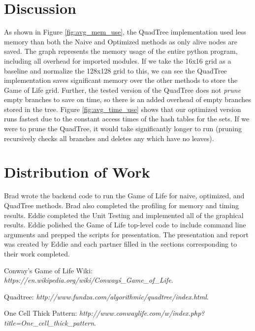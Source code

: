 \documentclass[11pt]{article}
\begin{document}
\section{Discussion}
As shown in Figure \ref{fig:avg_mem_use}, the QuadTree implementation used less memory than both the Naive and Optimized methods as only alive nodes are saved.  The graph represents the memory usage of the entire python program, including all overhead for imported modules.  If we take the 16x16 grid as a baseline and normalize the 128x128 grid to this, we can see the QuadTree implementation saves significant memory over the other methods to store the Game of Life grid.  Further, the tested version of the QuadTree does not \textit{prune} empty branches to save on time, so there is an added overhead of empty branches stored in the tree.  Figure \ref{fig:avg_time_use} shows that our optimized version runs fastest due to the constant access times of the hash tables for the sets.  If we were to prune the QuadTree, it would take significantly longer to run (pruning recursively checks all branches and deletes any which have no leaves).

\section{Distribution of Work}
Brad wrote the backend code to run the Game of Life for naive, optimized, and QuadTree methods.  Brad also completed the profiling for memory and timing results.  Eddie completed the Unit Testing and implemented all of the graphical results.  Eddie polished the Game of Life top-level code to include command line arguments and prepped the scripts for presentation.  The presentation and report was created by Eddie and each partner filled in the sections corresponding to their work completed.

\begin{thebibliography}{9}
Conway's Game of Life Wiki:
\textit{https://en.wikipedia.org/wiki/Conway\'s\_Game\_of\_Life}.

Quadtree:
\textit{http://www.fundza.com/algorithmic/quadtree/index.html}.

One Cell Thick Pattern:
\textit{http://www.conwaylife.com/w/index.php?title=One\_cell\_thick\_pattern}.

\end{thebibliography}
\end{document}
